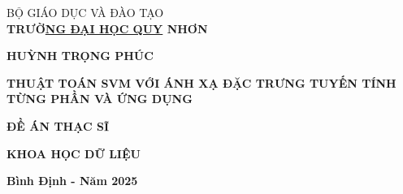 \thispagestyle{empty}

\thispagestyle{empty}
\begin{center}
\large BỘ GIÁO DỤC VÀ ĐÀO TẠO\\
{\bf \large TRƯỜ\underline{NG ĐẠI HỌC QUY} NHƠN}

\vspace*{2.0cm}

{\bf \large HUỲNH TRỌNG PHÚC}
\vspace*{2.0cm}

\begin{center}
\Large{\textbf{THUẬT TOÁN SVM VỚI ÁNH XẠ ĐẶC TRƯNG TUYẾN TÍNH TỪNG PHẦN VÀ ỨNG DỤNG}}
\end{center}
\vspace*{2cm}
\begin{center}
  \large{\textbf{ ĐỀ ÁN THẠC SĨ}}
\end{center}
\begin{center}
  \large{\textbf{ KHOA HỌC DỮ LIỆU}}
\end{center}

\vspace*{6cm}

{\bf Bình Định - Năm 2025}

\end{center}